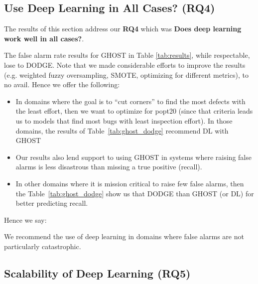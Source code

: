 \documentclass[10pt,compsoc,twocolumn]{IEEEtran}
\newcommand{\bi}{\begin{itemize}}
\newcommand{\ei}{\end{itemize}}
\begin{document}
\subsection{Use Deep Learning in All Cases? (RQ4)}
\label{sec:rq4}

The results of this section address our \textbf{RQ4} which was \textbf{Does deep learning work well in all cases?}.

The false alarm rate results for GHOST in Table \ref{tab:results}, while respectable, lose to DODGE.  Note that we made considerable efforts to improve the results (e.g. weighted fuzzy oversampling, SMOTE, optimizing for different metrics), to no avail.
 Hence we offer the following:
 \bi
 \item
 In domains where the goal  is to ``cut corners''
 to find the most defects with the least effort, then we want to optimize for popt20 (since that criteria leads us to models that find most bugs with least inspection effort). In those domains, the results of Table~\ref{tab:ghost_dodge}  recommend DL with GHOST
 \item Our results also lend support to using GHOST in systems where raising false alarms is less disastrous than missing a true positive (recall).
 \item In other domains where it is mission critical to raise few false alarms, then the Table~\ref{tab:ghost_dodge} show us that DODGE than GHOST (or DL) for better   predicting   recall. 
 \ei
Hence we say: 
 
 


\begin{blockquote}
    \noindent
    We recommend the use of deep learning in domains where false alarms are not particularly catastrophic.
\end{blockquote}

\subsection{Scalability of Deep Learning (RQ5)}
\label{sec:rq5}
\end{document}
